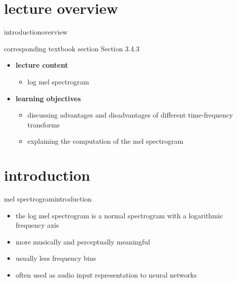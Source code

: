 


\subtitle{Module 3.4.3: Time-Frequency Representations~---~(Log) Mel-Spectrogram}


	

    \section[overview]{lecture overview}
        \begin{frame}{introduction}{overview}
            \begin{block}{corresponding textbook section}
                    Section 3.4.3
            \end{block}

            \begin{itemize}
                \item   \textbf{lecture content}
                    \begin{itemize}
                        \item   log mel spectrogram
                    \end{itemize}
                \bigskip
                \item<2->   \textbf{learning objectives}
                    \begin{itemize}
                        \item   discussing advantages and disadvantages of different time-frequency transforms
                        \item   explaining the computation of the mel spectrogram
                    \end{itemize}
            \end{itemize}
        \end{frame}
        
    \section[intro]{introduction}
        \begin{frame}{mel spectrogram}{introduction}
            \begin{itemize}
                \item   the log mel spectrogram is a normal spectrogram with a logarithmic frequency axis
                \bigskip
                \item   more musically and perceptually meaningful
                \item   usually less frequency bins
                \item   often used as audio input representation to neural networks
            \end{itemize}
        \end{frame}
        
